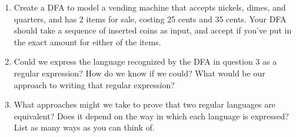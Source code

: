 \begin{enumerate}
		
	\newpage
\item Create a DFA to model a vending machine that accepts nickels, dimes, and quarters, and has 2 items for sale, costing 25 cents and 35 cents. Your DFA should take a sequence of inserted coins as input, and accept if you've put in the exact amount for either of the items.
		
\newpage
\item Could we express the language recognized by the DFA in question 3 as a regular expression? How do we know if we could? What would be our approach to writing that regular expression?
		
\newpage
\item What approaches might we take to prove that two regular languages are equivalent? Does it depend on the way in which each language is expressed? List as many ways as you can think of.
		
		
\end{enumerate}



